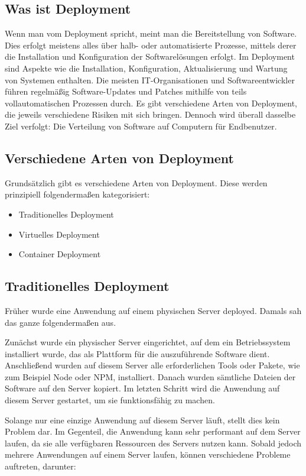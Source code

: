 \subsection{Was ist Deployment}

Wenn man vom Deployment spricht, meint man die Bereitstellung von Software. Dies erfolgt meistens alles über halb- oder automatisierte Prozesse, mittels derer die Installation und Konfiguration der Softwarelösungen erfolgt. Im Deployment sind Aspekte wie die Installation, Konfiguration, Aktualisierung und Wartung von Systemen enthalten.
Die meisten IT-Organisationen und Softwareentwickler führen regelmäßig Software-Updates und Patches mithilfe von teils vollautomatischen Prozessen durch. Es gibt verschiedene Arten von Deployment, die jeweils verschiedene Risiken mit sich bringen. Dennoch wird überall dasselbe Ziel verfolgt: Die Verteilung von Software auf Computern für Endbenutzer.

\subsection{Verschiedene Arten von Deployment}

Grundsätzlich gibt es verschiedene Arten von Deployment. Diese werden prinzipiell folgendermaßen kategorisiert:
    \begin{itemize}
    \item Traditionelles Deployment
    \item Virtuelles Deployment
    \item Container Deployment
    \end{itemize}
\newpage
\subsection{Traditionelles Deployment}

Früher wurde eine Anwendung auf einem physischen Server deployed. Damals sah das ganze folgendermaßen aus.

Zunächst wurde ein physischer Server eingerichtet, auf dem ein Betriebssystem installiert wurde, das als Plattform für die auszuführende Software dient. Anschließend wurden auf diesem Server alle erforderlichen Tools oder Pakete, wie zum Beispiel Node oder NPM, installiert. Danach wurden sämtliche Dateien der Software auf den Server kopiert. Im letzten Schritt wird die Anwendung auf diesem Server gestartet, um sie funktionsfähig zu machen.


Solange nur eine einzige Anwendung auf diesem Server läuft, stellt dies kein Problem dar. Im Gegenteil, die Anwendung kann sehr performant auf dem Server laufen, da sie alle verfügbaren Ressourcen des Servers nutzen kann. Sobald jedoch mehrere Anwendungen auf einem Server laufen, können verschiedene Probleme auftreten, darunter:


